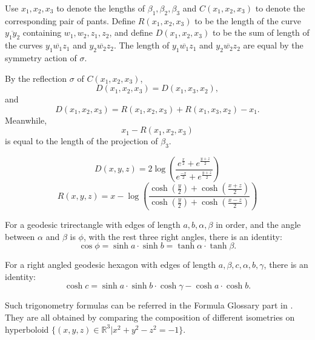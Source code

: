  Use $x_1,x_2,x_3$ to denote the lengths of $\beta_1,\beta_2,\beta_3$ and $C(x_1,x_2,x_3)$ to denote the corresponding pair of pants. Define $R(x_1,x_2,x_3)$ to be the length of the curve $\overline{y_1y_2}$ containing $w_1,w_2,z_1,z_2$, and define  $D(x_1,x_2,x_3)$ to be the sum of  length of the curves $\overline{y_1w_1z_1}$ and $\overline{y_2w_2z_2}$.   The length of  $\overline{y_1w_1z_1}$ and $\overline{y_2w_2z_2}$ are equal by the symmetry action of $\sigma$.
 
 \begin{remark}
 By the reflection $\sigma$ of $C(x_1,x_2,x_3)$, 
 $$D(x_1,x_2,x_3)=D(x_1,x_3,x_2),$$ and $$
 D(x_1,x_2,x_3)=R(x_1,x_2,x_3)+R(x_1,x_3,x_2)-x_1.$$ Meanwhile,
 $$x_1-R(x_1,x_2,x_3)$$ is equal to the length of the projection of $\beta_3$.
 \end{remark}
 
 \begin{lemma}\label{DR}
  \begin{equation}\label{DD}
  D(x,y,z)=2\log \left(\frac{e^{\frac{x}{2}}+e^{\frac{y+z}{2}}}{e^{\frac{-x}{2}}+e^{\frac{y+z}{2}}}\right)
  \end{equation}
 \begin{equation}\label{R}
     R(x,y,z)=x-\log \left(\frac{\cosh(\frac{y}{2})+\cosh (\frac{x+z}{2})}{\cosh(\frac{y}{2})+\cosh (\frac{x-z}{2})}\right)
 \end{equation}
 \end{lemma}
 
 \begin{lemma}\label{tri}
  For a geodesic trirectangle with edges of length $a,b,\alpha,\beta$ in order, and the angle between $\alpha$ and $\beta$ is $\phi$, with the rest three right angles, there is an identity:
  \begin{equation}\label{rect}
      \cos\phi=\sinh a\cdot \sinh b=\tanh\alpha\cdot \tanh\beta.
  \end{equation}
 \end{lemma}
 
 \begin{lemma}\label{hex}
   For a right angled geodesic hexagon with edges of length $a,\beta,c,\alpha,b,\gamma$,   there is an identity:
   \begin{equation}
       \cosh c=\sinh a\cdot\sinh b\cdot\cosh \gamma-\cosh a\cdot\cosh b.
   \end{equation}
 \end{lemma}
 
 \begin{remark}
 Such trigonometry formulas can be referred in the Formula Glossary part  in \cite{Buser}. They are all obtained by comparing the composition  of different isometries on hyperboloid $\{(x,y,z)\in \mathbb{R}^3|x^2+y^2-z^2=-1\}$.  
 \end{remark}
 
